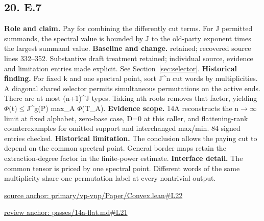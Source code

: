 \documentclass[11pt,letterpaper]{article}
\theoremstyle{definition}\newtheorem{definition}[theorem]{Definition}\newtheorem{example}[theorem]{Example}
\theoremstyle{remark}\newtheorem{remark}[theorem]{Remark}
\begin{document}
\subsection*{20. E.7}
\textbf{Role and claim.} Pay for combining the differently cut terms. For J permitted summands, the spectral value is bounded by J to the old-party exponent times the largest summand value.
\textbf{Baseline and change.} retained; recovered source lines 332--352. Substantive draft treatment retained; individual source, evidence and limitation entries made explicit. See Section~\ref{sec:selector}.
\textbf{Historical finding.} For fixed k and one spectral point, sort J\textasciicircum{}n cut words by multiplicities. A diagonal shared selector permits simultaneous permutations on the active ends. There are at most (n+1)\textasciicircum{}J types. Taking nth roots removes that factor, yielding \ensuremath{\Phi}(t)\ensuremath{\le}J\textasciicircum{}g(P) max\_A \ensuremath{\Phi}(T\_A).
\textbf{Evidence scope.} 14A reconstructs the n\ensuremath{\to}\ensuremath{\infty} limit at fixed alphabet, zero-base case, D=0 at this caller, and flattening-rank counterexamples for omitted support and interchanged max/min. 84 signed entries checked.
\textbf{Historical limitation.} The conclusion allows the paying cut to depend on the common spectral point. General border maps retain the extraction-degree factor in the finite-power estimate.
\textbf{Interface detail.} The common tensor is priced by one spectral point. Different words of the same multiplicity share one permutation label at every nontrivial output.
\par\href{https://github.com/nousentllc/VP-VNP-Review/blob/8a7976933b6b2b4ffda1ad3a0dfb5fc6b6f023e8/primary/vp-vnp/Paper/Convex.lean\#L22}{source anchor: primary/vp-vnp/Paper/Convex.lean\#L22}
\par\href{https://github.com/nousentllc/VP-VNP-Review/blob/8a7976933b6b2b4ffda1ad3a0dfb5fc6b6f023e8/passes/14a-flat.md\#L21}{review anchor: passes/14a-flat.md\#L21}
\goodbreak
\end{document}
